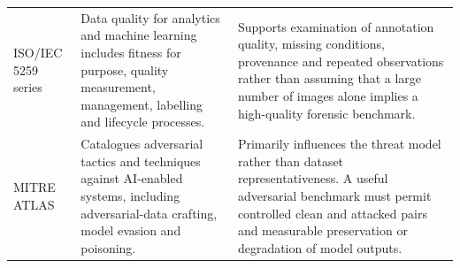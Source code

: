 \begin{table}[htbp]
\begin{tabularx}{\textwidth}{@{}
>{\raggedright\arraybackslash}p{}
>{\raggedright\arraybackslash}p{}
>{\raggedright\arraybackslash}X@{}}
ISO/IEC 5259 series
\citep{isoiec5259}
&
Data quality for analytics and machine learning includes fitness for purpose, quality measurement, management, labelling and lifecycle processes.
&
Supports examination of annotation quality, missing conditions, provenance and repeated observations rather than assuming that a large number of images alone implies a high-quality forensic benchmark.
\\

MITRE ATLAS
\citep{mitreatlas}
&
Catalogues adversarial tactics and techniques against AI-enabled systems, including adversarial-data crafting, model evasion and poisoning.
&
Primarily influences the threat model rather than dataset representativeness. A useful adversarial benchmark must permit controlled clean and attacked pairs and measurable preservation or degradation of model outputs.
\\

\bottomrule
\end{tabularx}
\end{table}

\newpage



\clearpage


